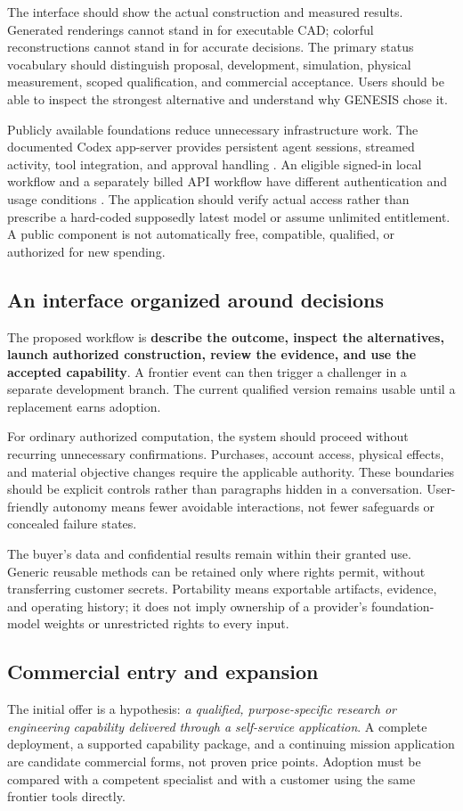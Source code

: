 \documentclass[11pt,letterpaper]{article}
\theoremstyle{remark}\newtheorem{remark}{Remark}[section]
\begin{document}
The interface should show the actual construction and measured results. Generated renderings cannot stand in for executable CAD; colorful reconstructions cannot stand in for accurate decisions. The primary status vocabulary should distinguish proposal, development, simulation, physical measurement, scoped qualification, and commercial acceptance. Users should be able to inspect the strongest alternative and understand why GENESIS chose it.

Publicly available foundations reduce unnecessary infrastructure work. The documented Codex app-server provides persistent agent sessions, streamed activity, tool integration, and approval handling \citep{codex2026}. An eligible signed-in local workflow and a separately billed API workflow have different authentication and usage conditions \citep{codexauth2026}. The application should verify actual access rather than prescribe a hard-coded supposedly latest model or assume unlimited entitlement. A public component is not automatically free, compatible, qualified, or authorized for new spending.

\subsection{An interface organized around decisions}
The proposed workflow is \textbf{describe the outcome, inspect the alternatives, launch authorized construction, review the evidence, and use the accepted capability}. A frontier event can then trigger a challenger in a separate development branch. The current qualified version remains usable until a replacement earns adoption.

For ordinary authorized computation, the system should proceed without recurring unnecessary confirmations. Purchases, account access, physical effects, and material objective changes require the applicable authority. These boundaries should be explicit controls rather than paragraphs hidden in a conversation. User-friendly autonomy means fewer avoidable interactions, not fewer safeguards or concealed failure states.

The buyer's data and confidential results remain within their granted use. Generic reusable methods can be retained only where rights permit, without transferring customer secrets. Portability means exportable artifacts, evidence, and operating history; it does not imply ownership of a provider's foundation-model weights or unrestricted rights to every input.

\subsection{Commercial entry and expansion}
The initial offer is a hypothesis: \emph{a qualified, purpose-specific research or engineering capability delivered through a self-service application}. A complete deployment, a supported capability package, and a continuing mission application are candidate commercial forms, not proven price points. Adoption must be compared with a competent specialist and with a customer using the same frontier tools directly.
\end{document}
